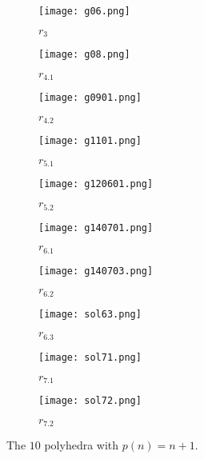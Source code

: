 \documentclass[11pt]{article}
\newlength{\numone}
\newlength{\widone}
\theoremstyle{definition}
\numberwithin{equation}{section}
\begin{document}
\begin{figure}[h!]
	\begin{subfigure}{\numone}
		\centering
		\texttt{[image: g06.png]}
		\caption{$r_{3}$}
	\end{subfigure}
	\begin{subfigure}{\numone}
		\centering
		\texttt{[image: g08.png]}
		\caption{$r_{4.1}$}
	\end{subfigure}
	\begin{subfigure}{\numone}
		\centering
		\texttt{[image: g0901.png]}
		\caption{$r_{4.2}$}
	\end{subfigure}
	\begin{subfigure}{\numone}
		\centering
		\texttt{[image: g1101.png]}
		\caption{$r_{5.1}$}
	\end{subfigure}
	\begin{subfigure}{\numone}
		\centering
		\texttt{[image: g120601.png]}
		\caption{$r_{5.2}$}
	\end{subfigure}
\begin{subfigure}{\numone}
	\centering
	\texttt{[image: g140701.png]}
	\caption{$r_{6.1}$}
\end{subfigure}
\begin{subfigure}{\numone}
	\centering
	\texttt{[image: g140703.png]}
	\caption{$r_{6.2}$}
\end{subfigure}
\begin{subfigure}{\numone}
	\centering
	\texttt{[image: sol63.png]}
	\caption{$r_{6.3}$}
\end{subfigure}
\begin{subfigure}{\numone}
	\centering
	\texttt{[image: sol71.png]}
	\caption{$r_{7.1}$}
\end{subfigure}
\begin{subfigure}{\numone}
	\centering
	\texttt{[image: sol72.png]}
	\caption{$r_{7.2}$}
\end{subfigure}
	\caption{The $10$ polyhedra with $p(n)=n+1$.}
	\label{fig:small}
\end{figure}
\end{document}
